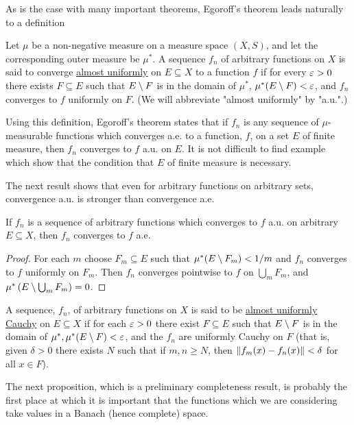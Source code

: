 As is the case with many important theorems, Egoroff's theorem leads naturally to a definition

\begin{definition}
Let $\mu$ be a non-negative measure on a measure space $(X,S)$, and let the corresponding outer measure be $\mu^*$. A sequence $f_n$ of arbitrary functions on $X$ is said to converge \underline{almost uniformly} on $E\subseteq X$ to a function $f$ if for every $\varepsilon>0$ there exists $F\subseteq E$ such that $E\setminus F$ is in the domain of $\mu^*$, $\mu^*(E\setminus F)<\varepsilon$, and $f_n$ converges to $f$ uniformly on $F$. (We will abbreviate "almost uniformly" by "a.u.".)
\end{definition}

Using this definition, Egoroff's theorem states that if $f_n$ is any sequence of $\mu$-measurable functions which converges a.e. to a function, $f$, on a set $E$ of finite measure, then $f_n$ converges to $f$ a.u. on $E$. It is not difficult to find example which show that the condition that $E$ of finite measure is necessary.

The next result shows that even for arbitrary functions on arbitrary sets, convergence a.u. is stronger than convergence a.e.

\begin{proposition}
If $f_n$ is a sequence of arbitrary functions which converges to $f$ a.u. on arbitrary $E \subseteq X$, then $f_n$ converges to $f$ a.e.
\end{proposition}

\begin{proof}
For each $m$ choose $F_m \subseteq E$ such that $\mu^*(E\setminus F_m)<1/m$ and $f_n$ converges to $f$ uniformly on $F_m$. Then $f_n$ converges pointwise to $f$ on $\bigcup_mF_m$, and $\mu^*\left(E\setminus\bigcup_m F_m\right)=0$.
\end{proof}

\begin{definition}
A sequence, $f_n$, of arbitrary functions on $X$ is said to be \underline{almost uniformly Cauchy} on $E \subseteq X$ if for each $\varepsilon>0$ there exist $F \subseteq E$ such that $E\setminus F$ is in the domain of $\mu^*, \mu^*(E\setminus F)<\varepsilon$, and the $f_n$ are uniformly Cauchy on $F$ (that is, given $\delta>0$ there exists $N$ such that if $m, n \geq N$, then $\norm{f_m(x)-f_n(x)}<\delta$ for all $x \in F$).
\end{definition}

The next proposition, which is a preliminary completeness result, is probably the first place at which it is important that the functions which we are considering take values in a Banach (hence complete) space.

